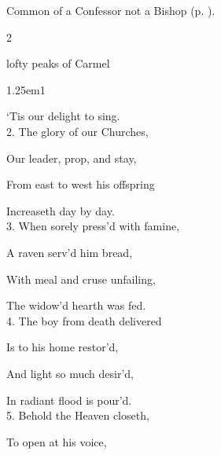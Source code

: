 \clearpage
{}

\begin{rubric}
	Common of a Confessor not a Bishop (p. \pageref{ConfessorNotBishopCollect}).
\end{rubric}




\begin{paracol}{2}
\sloppy

\firstEvensong
{}

\firstEvensongHymn
{} lofty peaks of Carmel



\begin{hangparas}{1.25em}{1}

`Tis our delight to sing.\\

2. The glory of our Churches,

Our leader, prop, and stay,

From east to west his offspring

Increaseth day by day.\\

3. When sorely press'd with famine,

A raven serv'd him bread,

With meal and cruse unfailing,

The widow'd hearth was fed.\\

4. The boy from death delivered

Is to his home restor'd,

And light so much desir'd,

In radiant flood is pour'd.\\

5. Behold the Heaven closeth,

To open at his voice,


\end{hangparas}
\end{paracol}
